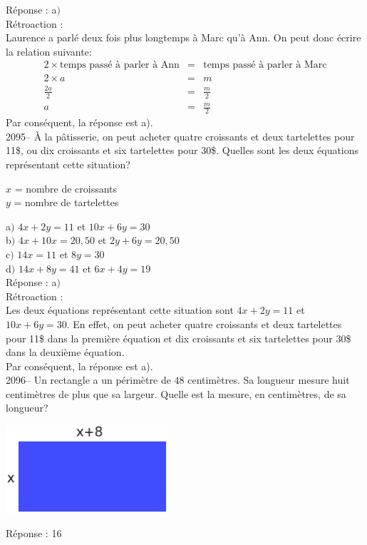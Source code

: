 \documentclass[letterpaper, 12pt]{article}
\begin{document}
R\'eponse : a$)$\\

R\'etroaction :\\
Laurence a parl\'e deux fois plus longtemps \`a Marc qu'\`a Ann. On peut donc \'ecrire la relation suivante:
\begin{eqnarray*}
 2 \times \textrm{temps pass\'e \`a parler \`a Ann} &=& \textrm{temps pass\'e \`a parler \`a Marc}\\
2 \times a &=& m\\[2mm]
\frac{2a}{2} &=& \frac{m}{2}\\[2mm]
a &=& \frac{m}{2}
\end{eqnarray*}
Par cons\'equent, la r\'eponse est a).\\

2095-- \`A la p\^atisserie, on peut acheter quatre croissants et deux tartelettes pour 11\$, ou dix croissants et six tartelettes pour 30\$. Quelles sont les deux \'equations repr\'esentant cette situation?
\begin{center}
 $x$ = nombre de croissants\\
$y$ = nombre de tartelettes
\end{center}

a$)$ $4x+2y=11$ et $10x+6y=30$\\
b$)$ $4x+10x=20,50$ et $2y+6y=20,50$\\
c$)$ $14x=11$ et $8y=30$\\
d$)$ $14x+8y=41$ et $6x+4y=19$\\

R\'eponse : a$)$\\

R\'etroaction :\\
Les deux \'equations repr\'esentant cette situation sont $4x+2y=11$ et $10x+6y=30$. En effet, on peut acheter quatre croissants et deux tartelettes pour 11\$ dans la premi\`ere \'equation et dix croissants et six tartelettes pour 30\$ dans la deuxi\`eme \'equation.\\
Par cons\'equent, la r\'eponse est a).\\

2096-- Un rectangle a un p\'erim\`etre de 48 centim\`etres. Sa longueur mesure huit centim\`etres de plus que sa largeur. Quelle est la mesure, en centim\`etres, de sa longueur?
\begin{center}
 \includegraphics[width=6cm,bb=14 14 435 315]{Q2096.eps}
\end{center}
R\'eponse : 16\\
\end{document}
